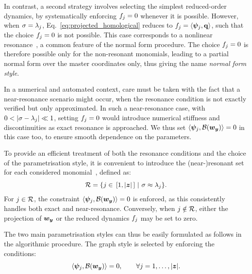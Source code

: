 \documentclass[%
reprint,
superscriptaddress,
 amsmath,amssymb,
 aps,
 pre
]{revtex4-2}
\begin{document}
In contrast, a second strategy involves selecting the simplest reduced-order dynamics, by systematically enforcing $f_j=0$ whenever it is possible.
However, when $\sigma = \lambda_j$, Eq.~\eqref{eq:projected_homological} reduces to $f_j = \langle \boldsymbol{\psi}_j, \mathbf{q} \rangle$, such that the choice $f_j=0$ is not possible. This case corresponds to a nonlinear resonance~\cite{Murdock}, a common feature of the normal form procedure. The choice $f_j=0$ is therefore possible only for the non-resonant monomials, leading to a partial normal form over the master coordinates only, thus giving the name {\it normal form style}.

In a numerical and automated context, care must be taken with the fact that a near-resonance scenario might occur, when the resonance condition is not exactly verified but only approximated. In such a near-resonance case, with $0 < |\sigma - \lambda_j| \ll 1$, setting $f_j = 0$ would introduce numerical stiffness and discontinuities as exact resonance is approached. We thus set $\langle \boldsymbol{\psi}_j, \mathcal{B} (\boldsymbol{w}_{{\boldsymbol{y}}}) \rangle = 0$ in this case too, to ensure smooth dependence on the parameters.

To provide an efficient treatment of both the resonance conditions and the choice of the parametrisation style, it is convenient to introduce the (near-)resonant set for each considered monomial~\cite{vizza2023superharm}, defined as:
\begin{equation}
\label{eq:resonant_set}
    \mathcal{R} = \{ j \in \, [1,|{\boldsymbol{z}}| \,] \ | \ \sigma \approx \lambda_j \}.
\end{equation}
For $j \in \mathcal{R}$, the constraint $\langle \boldsymbol{\psi}_j, \mathcal{B} (\boldsymbol{w}_{{\boldsymbol{y}}}) \rangle = 0$ is enforced, as this consistently handles both exact and near-resonance. Conversely, when $j \notin \mathcal{R}$, either the projection of $\boldsymbol{w}_{\boldsymbol{y}}$ or the reduced dynamics $f_j$ may be set to zero.


The two main parametrisation styles can thus be easily formulated as follows in the algorithmic procedure. The graph style is selected by enforcing the conditions:
\begin{equation}
 \label{eq:constraints_graph_style}
     \langle \boldsymbol{\psi}_j, \mathcal{B} (\boldsymbol{w}_{{\boldsymbol{y}}}) \rangle = 0, \qquad \forall j = 1,\ldots,|{\boldsymbol{z}}|.
 \end{equation}
\end{document}
